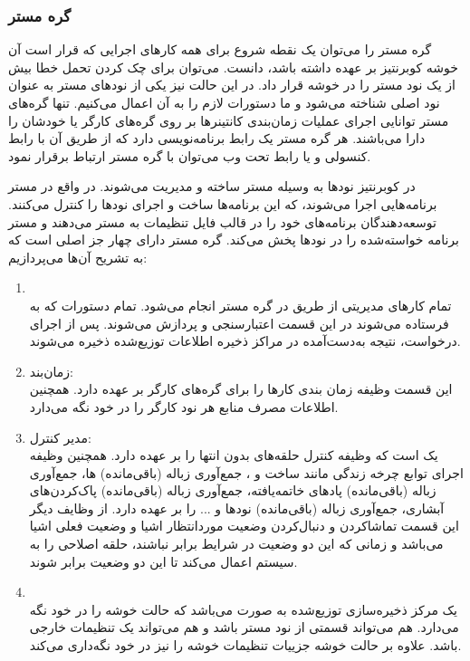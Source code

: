 \subsubsection*{گره مستر}
گره مستر را می‌توان یک نقطه شروع برای همه کارهای اجرایی که قرار است آن خوشه کوبرنتیز بر عهده داشته باشد، دانست. می‌توان برای چک کردن تحمل خطا بیش از یک نود مستر را در خوشه قرار داد. در این حالت نیز یکی از نودهای مستر به عنوان نود اصلی شناخته می‌شود و ما دستورات لازم را به آن اعمال می‌کنیم. تنها گره‌های مستر توانایی اجرای عملیات زمان‌بندی کانتینرها بر روی گره‌های کارگر یا خودشان را دارا می‌باشند. هر گره مستر یک رابط برنامه‌نویسی دارد که از طریق آن با رابط کنسولی و یا رابط تحت وب می‌توان با گره مستر ارتباط برقرار نمود.

در کوبرنتیز نودها به وسیله مستر ساخته و مدیریت می‌شوند. در واقع در مستر برنامه‌هایی اجرا می‌شوند، که این برنامه‌ها ساخت و اجرای نودها را کنترل می‌کنند. توسعه‌دهندگان برنامه‌های خود را در قالب فایل تنظیمات به مستر می‌دهند و مستر برنامه خواسته‌شده را در نودها پخش می‌کند.
\newline
\newline
گره مستر دارای چهار جز اصلی است که به تشریح آن‌ها می‌پردازیم:
\begin{enumerate}
	\item
	\\
	تمام کارهای مدیریتی از طریق 
	در گره مستر انجام می‌شود. تمام دستورات
	که به
	فرستاده می‌شوند در این قسمت اعتبارسنجی و پردازش می‌شوند. پس از اجرای درخواست، نتیجه به‌دست‌آمده در مراکز ذخیره اطلاعات توزیع‌شده ذخیره می‌شوند.
	\item
	زمان‌بند: \\
	این قسمت وظیفه زمان بندی کارها را برای گره‌های کارگر بر عهده دارد. همچنین اطلاعات مصرف منابع هر نود کارگر را در خود نگه می‌دارد.
	\item
	مدیر کنترل:\\
	یک
	است که وظیفه کنترل حلقه‌های بدون انتها را بر عهده دارد. همچنین وظیفه اجرای توابع چرخه زندگی مانند ساخت
	و
	، جمع‌آوری زباله (باقی‌مانده) 
	ها، جمع‌آوری زباله (باقی‌مانده) پادهای خاتمه‌یافته، جمع‌آوری زباله (باقی‌مانده) پاک‌کردن‌های آبشاری، جمع‌آوری زباله (باقی‌مانده) نودها و ... را بر عهده دارد. از وظایف دیگر این قسمت تماشا‌کردن و دنبال‌کردن وضعیت مورد‌انتظار اشیا و وضعیت فعلی اشیا می‌باشد و زمانی که این دو وضعیت در شرایط برابر نباشند، حلقه اصلاحی را به سیستم اعمال می‌کند تا این دو وضعیت برابر شوند.
	\item
	\\
	یک مرکز ذخیره‌سازی توزیع‌شده به صورت
	می‌باشد که حالت خوشه را در خود نگه می‌دارد. هم می‌تواند قسمتی از نود مستر باشد و هم می‌تواند یک تنظیمات خارجی باشد. علاوه بر حالت خوشه جزییات تنظیمات خوشه را نیز در خود نگه‌داری می‌کند.
\end{enumerate}


